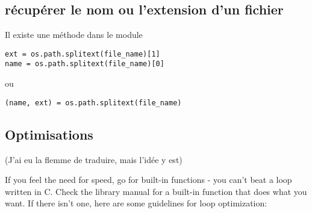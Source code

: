 \documentclass[a4paper,twoside]{article}
\begin{document}
\subsection{récupérer le nom ou l'extension d'un fichier}
Il existe une méthode dans le module 
\begin{verbatim}
ext = os.path.splitext(file_name)[1]
name = os.path.splitext(file_name)[0]
\end{verbatim}
ou 
\begin{verbatim}
(name, ext) = os.path.splitext(file_name)
\end{verbatim}



\subsection{Optimisations}
(J'ai eu la flemme de traduire, mais l'idée y est)

If you feel the need for speed, go for built-in functions - you can't beat a loop written in C. Check the library manual for a built-in function that does what you want. If there isn't one, here are some guidelines for loop optimization:
\end{document}
